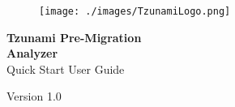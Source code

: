 \pagestyle{empty}
\begin{figure}[tp] %
\texttt{[image: ./images/TzunamiLogo.png]}
\end{figure}
\begin{flushright}  
	\vspace*{\fill}
	 \textcolor{coverTextColor}{\huge \textbf{Tzunami Pre-Migration}}\\
	 \textcolor{coverTextColor}{\huge \textbf{{Analyzer}\\}}  
	Quick Start User Guide
	\vspace*{\fill}
\par

\end{flushright}
\begin{center} 
{\Large\vspace*{2mm} \par\vspace*{4mm} \vspace*{3mm}\large Version 1.0}\par %
\end{center} 
 